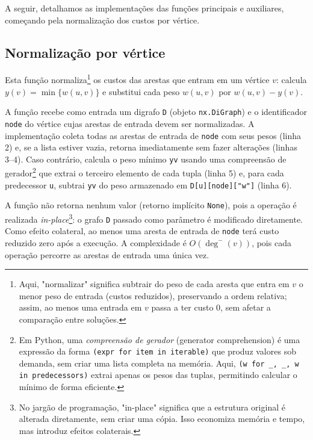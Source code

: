 A seguir, detalhamos as implementações das funções principais e auxiliares, começando pela normalização dos custos por vértice.

\subsection{Normalização por vértice}

Esta função normaliza\footnote{Aqui, "normalizar" significa subtrair do peso de cada aresta que entra em $v$ o menor peso de entrada (custos reduzidos), preservando a ordem relativa; assim, ao menos uma entrada em $v$ passa a ter custo 0, sem afetar a comparação entre soluções.} os custos das arestas que entram em um vértice \(v\): calcula \(y(v)=\min\{w(u,v)\}\) e substitui cada peso \(w(u,v)\) por \(w(u,v)-y(v)\).

A função recebe como entrada um digrafo \texttt{D} (objeto \texttt{nx.DiGraph}) e o identificador \texttt{node} do vértice cujas arestas de entrada devem ser normalizadas. A implementação coleta todas as arestas de entrada de \texttt{node} com seus pesos (linha 2) e, se a lista estiver vazia, retorna imediatamente sem fazer alterações (linhas 3--4). Caso contrário, calcula o peso mínimo \texttt{yv} usando uma compreensão de gerador\footnote{Em Python, uma \emph{compreensão de gerador} (generator comprehension) é uma expressão da forma \texttt{(expr for item in iterable)} que produz valores sob demanda, sem criar uma lista completa na memória. Aqui, \texttt{(w for \_, \_, w in predecessors)} extrai apenas os pesos das tuplas, permitindo calcular o mínimo de forma eficiente.} que extrai o terceiro elemento de cada tupla (linha 5) e, para cada predecessor \texttt{u}, subtrai \texttt{yv} do peso armazenado em \texttt{D[u][node]["w"]} (linha 6).

A função não retorna nenhum valor (retorno implícito \texttt{None}), pois a operação é realizada \emph{in-place}\footnote{No jargão de programação, "in-place" significa que a estrutura original é alterada diretamente, sem criar uma cópia. Isso economiza memória e tempo, mas introduz efeitos colaterais.}: o grafo \texttt{D} passado como parâmetro é modificado diretamente. Como efeito colateral, ao menos uma aresta de entrada de \texttt{node} terá custo reduzido zero após a execução. A complexidade é \(O(\deg^-(v))\), pois cada operação percorre as arestas de entrada uma única vez.

